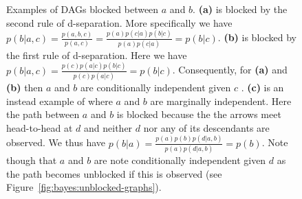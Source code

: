 \begin{figure}[p]
	\centering 
	\begin{subfigure}[t]{0.32\textwidth}
		\centering
		\resizebox{0.9\textwidth}{!}{
		}
		\caption{\label{fig:bayes:block1}}
	\end{subfigure}
	\begin{subfigure}[t]{0.32\textwidth}
		\centering
		\resizebox{0.9\textwidth}{!}{
		}
		\caption{\label{fig:bayes:block2}}
	\end{subfigure}
	\begin{subfigure}[t]{0.32\textwidth}
		\centering
		\resizebox{0.9\textwidth}{!}{
		}
		\caption{\label{fig:bayes:block3}}
	\end{subfigure}
	\caption{Examples of DAGs blocked between $a$ and $b$.  \textbf{(a)} is blocked
		by the second rule of d-separation.  More specifically we have 
		$p(b|a,c)=\frac{p(a,b,c)}{p(a,c)} = \frac{p(a)p(c|a)p(b|c)}{p(a)p(c|a)} = p(b|c)$.
		\textbf{(b)} is blocked by the first rule of d-separation.  Here we have
		$p(b|a,c)=\frac{p(c)p(a|c)p(b|c)}{p(c)p(a|c)} = p(b|c)$.  Consequently, for \textbf{(a)} 
		and \textbf{(b)} then $a$ and $b$ are conditionally independent given $c$ .
		\textbf{(c)} is an instead example of where $a$ and $b$ are marginally independent.  Here
		the path between $a$ and $b$ is blocked because the the arrows meet head-to-head at 
		$d$ and neither $d$ nor any of its
		descendants are observed.  We thus have $p(b|a) = \frac{p(a)p(b)p(d|a,b)}{p(a)p(d|a,b)} = p(b)$.
		Note though that $a$ and $b$ are note conditionally independent given $d$ as
		the path becomes unblocked if this is observed (see Figure~\ref{fig:bayes:unblocked-graphs}).
		\label{fig:bayes:blocked-graphs}}
\end{figure}

